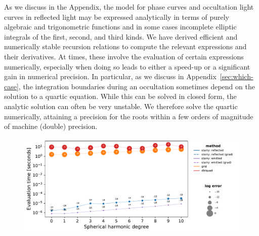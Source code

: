 \documentclass[modern]{aastex62}
\begin{document}
As we discuss in the Appendix, the model for phase curves and
occultation light curves in reflected light may be expressed
analytically in terms of purely algebraic and trigonometric functions
and in some cases incomplete elliptic integrals of the first, second,
and third kinds. We have derived efficient and numerically stable
recursion relations to compute the relevant expressions and their
derivatives. At times, these involve the evaluation of certain
expressions numerically, especially when doing so
leads to either a speed-up or a significant gain in numerical precision.
In particular, as we discuss in Appendix~\ref{sec:which-case}, the
integration boundaries during an occultation sometimes depend on the
solution to a quartic equation. While this can be solved in closed form,
the analytic solution can often be very unstable. We therefore solve
the quartic numerically, attaining a precision for the roots within a
few orders of magnitude of machine (double) precision.

\begin{figure}[p!]
    \begin{centering}
        \includegraphics[width=\linewidth]{figures/speed_no_occ.pdf}
    \end{centering}
\end{figure}
\end{document}
